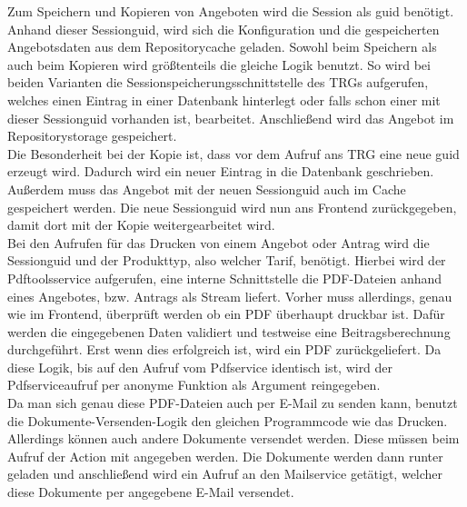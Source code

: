 Zum Speichern und Kopieren von Angeboten wird die Session als \ac{guid} benötigt. Anhand dieser Sessionguid, wird sich die Konfiguration und die gespeicherten Angebotsdaten aus dem Repositorycache geladen. Sowohl beim Speichern als auch beim Kopieren wird größtenteils die gleiche Logik benutzt. So wird bei beiden Varianten die Sessionspeicherungsschnittstelle des \ac{TRG}s aufgerufen, welches einen Eintrag in einer Datenbank hinterlegt oder falls schon einer mit dieser Sessionguid vorhanden ist, bearbeitet. Anschließend wird das Angebot im Repositorystorage gespeichert. \\ Die Besonderheit bei der Kopie ist, dass vor dem Aufruf ans \ac{TRG} eine neue \ac{guid} erzeugt wird. Dadurch wird ein neuer Eintrag in die Datenbank geschrieben. Außerdem muss das Angebot mit der neuen Sessionguid auch im Cache gespeichert werden. Die neue Sessionguid wird nun ans Frontend zurückgegeben, damit dort mit der Kopie weitergearbeitet wird.\\
Bei den Aufrufen für das Drucken von einem Angebot oder Antrag wird die Sessionguid und der Produkttyp, also welcher Tarif, benötigt. Hierbei wird der Pdftoolsservice aufgerufen, eine interne Schnittstelle die PDF-Dateien anhand eines Angebotes, bzw. Antrags als Stream liefert. Vorher muss allerdings, genau wie im Frontend, überprüft werden ob ein PDF überhaupt druckbar ist. Dafür werden die eingegebenen Daten validiert und testweise eine Beitragsberechnung durchgeführt. Erst wenn dies erfolgreich ist, wird ein PDF zurückgeliefert. Da diese Logik, bis auf den Aufruf vom Pdfservice identisch ist, wird der Pdfserviceaufruf per anonyme Funktion als Argument reingegeben.\\
Da man sich genau diese PDF-Dateien auch per E-Mail zu senden kann, benutzt die Dokumente-Versenden-Logik den gleichen Programmcode wie das Drucken. Allerdings können auch andere Dokumente versendet werden. Diese müssen beim Aufruf der Action mit angegeben werden. Die Dokumente werden dann runter geladen und anschließend wird ein Aufruf an den Mailservice getätigt, welcher diese Dokumente per angegebene E-Mail versendet.

